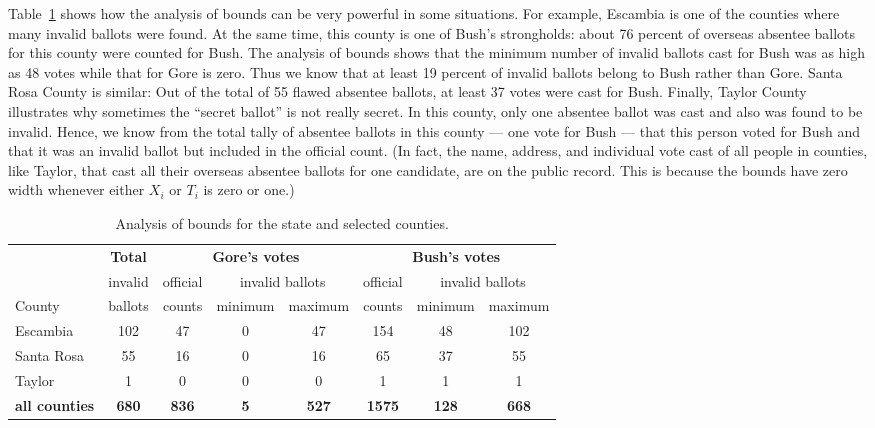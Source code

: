 \documentclass[11pt,titlepage]{article}
\begin{document}
Table~\ref{tb:bounds} shows how the analysis of bounds can be very
powerful in some situations. For example, Escambia is one of the
counties where many invalid ballots were found. At the same time, this
county is one of Bush's strongholds: about 76 percent of overseas
absentee ballots for this county were counted for Bush. The analysis
of bounds shows that the minimum number of invalid ballots cast for
Bush was as high as 48 votes while that for Gore is zero. Thus we know
that at least 19 percent of invalid ballots belong to Bush rather than
Gore.  Santa Rosa County is similar: Out of the total of 55 flawed
absentee ballots, at least 37 votes were cast for Bush.  Finally,
Taylor County illustrates why sometimes the ``secret ballot'' is not
really secret.  In this county, only one absentee ballot was cast and
also was found to be invalid. Hence, we know from the total tally of
absentee ballots in this county --- one vote for Bush --- that this
person voted for Bush and that it was an invalid ballot but included
in the official count.  (In fact, the name, address, and individual
vote cast of all people in counties, like Taylor, that cast all their
overseas absentee ballots for one candidate, are on the public record.
This is because the bounds have zero width whenever either $X_i$ or
$T_i$ is zero or one.)
\begin{table}[t]
\begin{center}
\begin{tabular}{l c |ccc|ccc}
  & \bf Total   & \multicolumn{3}{c|}{\bf Gore's votes} &
  \multicolumn{3}{c}{\bf Bush's votes} \\
  & invalid & official & \multicolumn{2}{c|}{invalid ballots} & official &
  \multicolumn{2}{c}{invalid ballots} \\
County & ballots & counts & minimum & maximum & counts & minimum & maximum \\
\hline 
Escambia   & 102 & 47 & 0 & 47 & 154 & 48 & 102 \\
Santa Rosa &  55 & 16 & 0 & 16 &  65 & 37 &  55 \\
Taylor      &   1 &  0 & 0 &  0 &   1 &  1 &   1 \\
\hline
\bf all counties & \bf 680 & \bf 836 & \bf 5 & \bf 527 & \bf 1575 & \bf 128 & \bf 668 \\ 
\end{tabular} \caption{Analysis of bounds for the state  and 
  selected counties.}\label{tb:bounds}
\end{center}
\end{table} 
\end{document}
